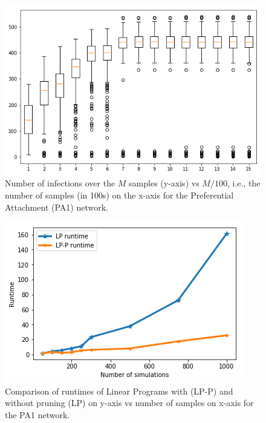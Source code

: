 \begin{figure}[!h]
    \centering
    \includegraphics[scale = 0.35]{Figuresnew/boxplotpa.png}
    \caption{Number of infections over the $M$ samples (y-axis) vs $M/100$, i.e., the number of samples (in 100s) on the x-axis
for the Preferential Attachment (PA1) network.
}
    \label{fig:pa_boxplot}
\end{figure}


\begin{figure}[!h]
    \centering
    \includegraphics[scale = 0.5]{Figuresnew/pa1_runtime}
    \caption{Comparison of runtimes of Linear Programs with (LP-P) and without pruning (LP) on y-axis vs 
number of samples on x-axis for the PA1 network. }
    \label{fig:pa1pruningtime}
\end{figure}


